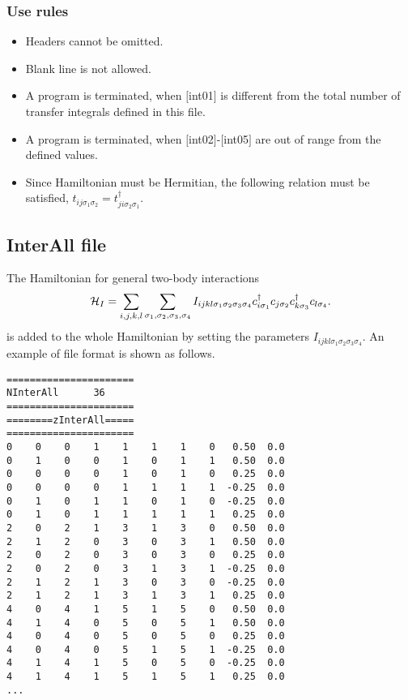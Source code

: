 \subsubsection{Use rules}
\begin{itemize}
\item Headers cannot be omitted. 
\item Blank line is not allowed.
\item A program is terminated, when $[$int01$]$ is different from the total number of transfer integrals defined in this file.
\item A program is terminated, when $[$int02$]$-$[$int05$]$ are out of range from the defined values.
\item Since Hamiltonian must be Hermitian, the following relation must be satisfied, $t_{ij\sigma_1\sigma_2}=t_{ji\sigma_2\sigma_1}^{\dagger}$. 
\end{itemize}

\newpage
\subsection{InterAll file}
\label{Subsec:interall}
The Hamiltonian for general two-body interactions 
\begin{align}
{\cal H}_I =\sum_{i,j,k,l}\sum_{\sigma_1,\sigma_2, \sigma_3, \sigma_4}
I_{ijkl\sigma_1\sigma_2\sigma_3\sigma_4}c_{i\sigma_1}^{\dagger}c_{j\sigma_2}c_{k\sigma_3}^{\dagger}c_{l\sigma_4}.
\end{align}
is added to the whole Hamiltonian by setting the parameters $I_{ijkl\sigma_1\sigma_2\sigma_3\sigma_4}$. 
An example of file format is shown as follows.

\begin{minipage}{12.5cm}
\begin{screen}
\begin{verbatim}
====================== 
NInterAll      36  
====================== 
========zInterAll===== 
====================== 
0    0    0    1    1    1    1    0   0.50  0.0
0    1    0    0    1    0    1    1   0.50  0.0
0    0    0    0    1    0    1    0   0.25  0.0
0    0    0    0    1    1    1    1  -0.25  0.0
0    1    0    1    1    0    1    0  -0.25  0.0
0    1    0    1    1    1    1    1   0.25  0.0
2    0    2    1    3    1    3    0   0.50  0.0
2    1    2    0    3    0    3    1   0.50  0.0
2    0    2    0    3    0    3    0   0.25  0.0
2    0    2    0    3    1    3    1  -0.25  0.0
2    1    2    1    3    0    3    0  -0.25  0.0
2    1    2    1    3    1    3    1   0.25  0.0
4    0    4    1    5    1    5    0   0.50  0.0
4    1    4    0    5    0    5    1   0.50  0.0
4    0    4    0    5    0    5    0   0.25  0.0
4    0    4    0    5    1    5    1  -0.25  0.0
4    1    4    1    5    0    5    0  -0.25  0.0
4    1    4    1    5    1    5    1   0.25  0.0
...
\end{verbatim}
\end{screen}
\end{minipage}


